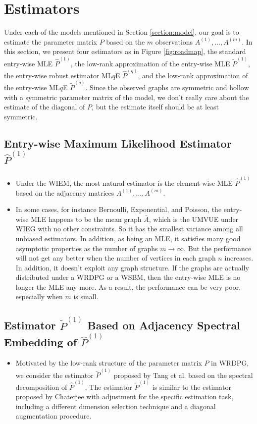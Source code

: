 \documentclass[a4paper]{article}
\renewcommand{\hat}{\widehat}
\begin{document}
\section{Estimators}

Under each of the models mentioned in Section \ref{section:model}, our goal is to estimate the parameter matrix $P$ based on the $m$ observations $A^{(1)}, \dotsc, A^{(m)}$. In this section, we present four estimators as in Figure \ref{fig:roadmap}, the standard entry-wise MLE $\hat{P}^{(1)}$, the low-rank approximation of the entry-wise MLE $\widetilde{P}^{(1)}$, the entry-wise robust estimator ML$q$E $\hat{P}^{(q)}$, and the low-rank approximation of the entry-wise ML$q$E $\widetilde{P}^{(q)}$. Since the observed graphs are symmetric and hollow with a symmetric parameter matrix of the model, we don't really care about the estimate of the diagonal of $P$, but the estimate itself should be at least symmetric.

\subsection{Entry-wise Maximum Likelihood Estimator $\hat{P}^{(1)}$}
\begin{itemize}
\item Under the WIEM, the most natural estimator is the element-wise MLE $\hat{P}^{(1)}$ based on the adjacency matrices $A^{(1)}, \dotsc, A^{(m)}$.
\item In some cases, for instance Bernoulli, Exponential, and Poisson, the entry-wise MLE happens to be the mean graph $\bar{A}$, which is the UMVUE under WIEG with no other constraints. So it has the smallest variance among all unbiased estimators. In addition, as being an MLE, it satisfies many good asymptotic properties as the number of graphs $m \to \infty$. But the performance will not get any better when the number of vertices in each graph $n$ increases. In addition, it doesn't exploit any graph structure. If the graphs are actually distributed under a WRDPG or a WSBM, then the entry-wise MLE is no longer the MLE any more. As a result, the performance can be very poor, especially when $m$ is small.
\end{itemize}



\subsection{Estimator $\widetilde{P}^{(1)}$ Based on Adjacency Spectral Embedding of $\hat{P}^{(1)}$}
\begin{itemize}
\item Motivated by the low-rank structure of the parameter matrix $P$ in WRDPG, we consider the estimator $\widetilde{P}^{(1)}$ proposed by Tang et al. \cite{tang2016law} based on the spectral decomposition of $\hat{P}^{(1)}$. The estimator $\widetilde{P}^{(1)}$ is similar to the estimator proposed by Chaterjee \cite{chatterjee2015matrix} with adjustment for the specific estimation task, including a different dimension selection technique and a diagonal augmentation procedure.
\end{itemize}
\end{document}
